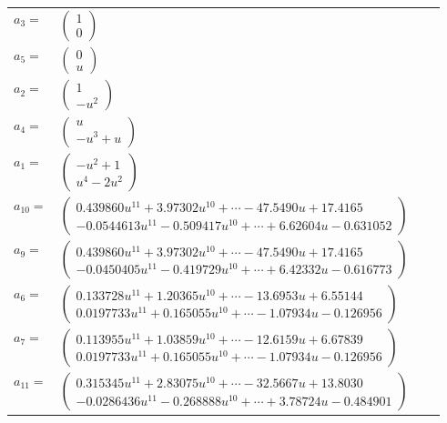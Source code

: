 \documentclass[1p]{elsarticle_modified}
\theoremstyle{definition}
\begin{document}
\begin{tabular}{m{7pt} m{180pt} m{7pt} m{180pt} }
\flushright $a_{3}=$&$\begin{pmatrix}1\\0\end{pmatrix}$ \\
\flushright $a_{5}=$&$\begin{pmatrix}0\\u\end{pmatrix}$ \\
\flushright $a_{2}=$&$\begin{pmatrix}1\\- u^2\end{pmatrix}$ \\
\flushright $a_{4}=$&$\begin{pmatrix}u\\- u^3+u\end{pmatrix}$ \\
\flushright $a_{1}=$&$\begin{pmatrix}- u^2+1\\u^4-2 u^2\end{pmatrix}$ \\
\flushright $a_{10}=$&$\begin{pmatrix}0.439860 u^{11}+3.97302 u^{10}+\cdots-47.5490 u+17.4165\\-0.0544613 u^{11}-0.509417 u^{10}+\cdots+6.62604 u-0.631052\end{pmatrix}$ \\
\flushright $a_{9}=$&$\begin{pmatrix}0.439860 u^{11}+3.97302 u^{10}+\cdots-47.5490 u+17.4165\\-0.0450405 u^{11}-0.419729 u^{10}+\cdots+6.42332 u-0.616773\end{pmatrix}$ \\
\flushright $a_{6}=$&$\begin{pmatrix}0.133728 u^{11}+1.20365 u^{10}+\cdots-13.6953 u+6.55144\\0.0197733 u^{11}+0.165055 u^{10}+\cdots-1.07934 u-0.126956\end{pmatrix}$ \\
\flushright $a_{7}=$&$\begin{pmatrix}0.113955 u^{11}+1.03859 u^{10}+\cdots-12.6159 u+6.67839\\0.0197733 u^{11}+0.165055 u^{10}+\cdots-1.07934 u-0.126956\end{pmatrix}$ \\
\flushright $a_{11}=$&$\begin{pmatrix}0.315345 u^{11}+2.83075 u^{10}+\cdots-32.5667 u+13.8030\\-0.0286436 u^{11}-0.268888 u^{10}+\cdots+3.78724 u-0.484901\end{pmatrix}$ \\

\end{tabular}
\end{document}
